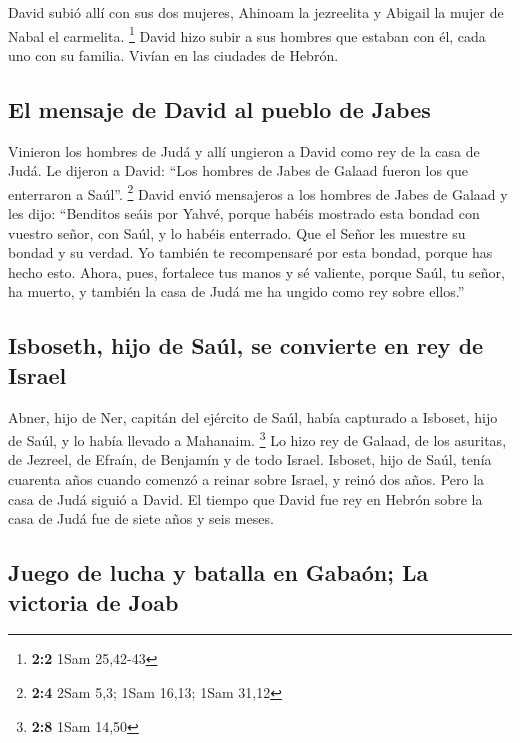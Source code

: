  David subió allí con sus dos mujeres, Ahinoam la
jezreelita y Abigail la mujer de Nabal el carmelita. \footnote{\textbf{2:2}
  1Sam 25,42-43}  David hizo subir a sus hombres que
estaban con él, cada uno con su familia. Vivían en las ciudades de
Hebrón.

\hypertarget{el-mensaje-de-david-al-pueblo-de-jabes}{%
\subsection{El mensaje de David al pueblo de
Jabes}\label{el-mensaje-de-david-al-pueblo-de-jabes}}

 Vinieron los hombres de Judá y allí ungieron a David como
rey de la casa de Judá. Le dijeron a David: ``Los hombres de Jabes de
Galaad fueron los que enterraron a Saúl''. \footnote{\textbf{2:4} 2Sam
  5,3; 1Sam 16,13; 1Sam 31,12}  David envió mensajeros a
los hombres de Jabes de Galaad y les dijo: ``Benditos seáis por Yahvé,
porque habéis mostrado esta bondad con vuestro señor, con Saúl, y lo
habéis enterrado.  Que el Señor les muestre su bondad y su
verdad. Yo también te recompensaré por esta bondad, porque has hecho
esto.  Ahora, pues, fortalece tus manos y sé valiente,
porque Saúl, tu señor, ha muerto, y también la casa de Judá me ha ungido
como rey sobre ellos.''

\hypertarget{isboseth-hijo-de-sauxfal-se-convierte-en-rey-de-israel}{%
\subsection{Isboseth, hijo de Saúl, se convierte en rey de
Israel}\label{isboseth-hijo-de-sauxfal-se-convierte-en-rey-de-israel}}

 Abner, hijo de Ner, capitán del ejército de Saúl, había
capturado a Isboset, hijo de Saúl, y lo había llevado a Mahanaim.
\footnote{\textbf{2:8} 1Sam 14,50}  Lo hizo rey de Galaad,
de los asuritas, de Jezreel, de Efraín, de Benjamín y de todo Israel.
 Isboset, hijo de Saúl, tenía cuarenta años cuando
comenzó a reinar sobre Israel, y reinó dos años. Pero la casa de Judá
siguió a David.  El tiempo que David fue rey en Hebrón
sobre la casa de Judá fue de siete años y seis meses.

\hypertarget{juego-de-lucha-y-batalla-en-gabauxf3n-la-victoria-de-joab}{%
\subsection{Juego de lucha y batalla en Gabaón; La victoria de
Joab}\label{juego-de-lucha-y-batalla-en-gabauxf3n-la-victoria-de-joab}}

